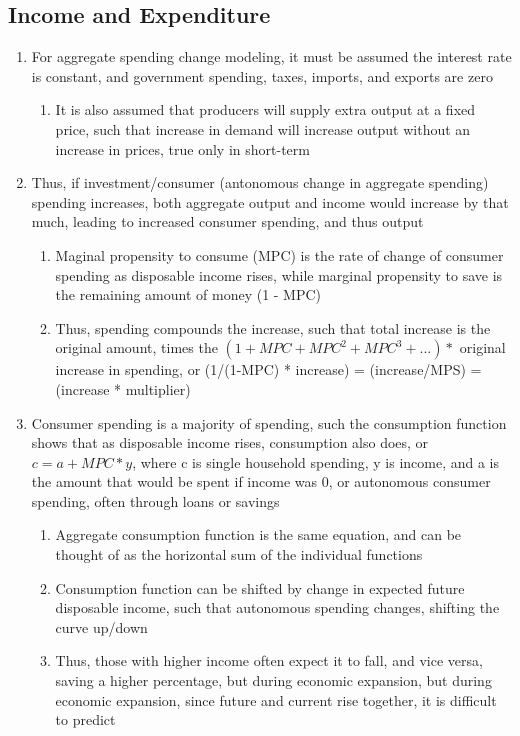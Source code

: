 \documentclass[11 pt, twoside]{article}
\begin{document}
\subsection{Income and Expenditure}
\begin{enumerate}
\item For aggregate spending change modeling, it must be assumed the interest rate is constant, and government spending, taxes, imports, and exports are zero
\begin{enumerate}
\item It is also assumed that producers will supply extra output at a fixed price, such that increase in demand will increase output without an increase in prices, true only in short-term
\end{enumerate}
\item Thus, if investment/consumer (antonomous change in aggregate spending) spending increases, both aggregate output and income would increase by that much, leading to increased consumer spending, and thus output
\begin{enumerate}
\item Maginal propensity to consume (MPC) is the rate of change of consumer spending as disposable income rises, while marginal propensity to save is the remaining amount of money (1 - MPC)
\item Thus, spending compounds the increase, such that total increase is the original amount, times the $(1 + MPC + MPC^2 + MPC^3 + ...) *$ original increase in spending, or (1/(1-MPC) * increase) = (increase/MPS) = (increase * multiplier)
\end{enumerate}
\item Consumer spending is a majority of spending, such the consumption function shows that as disposable income rises, consumption also does, or $c = a + MPC * y$, where c is single household spending, y is income, and a is the amount that would be spent if income was 0, or autonomous consumer spending, often through loans or savings
\begin{enumerate}
\item Aggregate consumption function is the same equation, and can be thought of as the horizontal sum of the individual functions
\item Consumption function can be shifted by change in expected future disposable income, such that autonomous spending changes, shifting the curve up/down
\item Thus, those with higher income often expect it to fall, and vice versa, saving a higher percentage, but during economic expansion, but during economic expansion, since future and current rise together, it is difficult to predict

\end{enumerate}
\end{enumerate}
\end{document}
